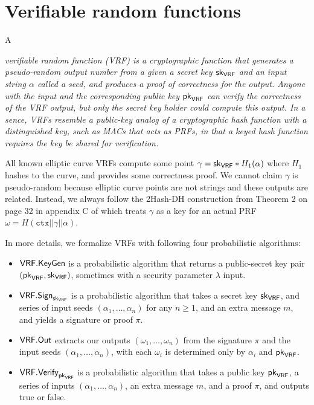 \section{Verifiable random functions}


A {\em verifiable random function (VRF) is a cryptographic function that generates a pseudo-random output number from a given a secret key $\mathsf{sk}_{\mathsf{VRF}}$ and an input string $\alpha$ called a seed, and produces a proof of correctness for the output.  Anyone with the input and the corresponding public key $\mathsf{pk}_{\mathsf{VRF}}$ can verify the correctness of the VRF output, but only the secret key holder could compute this output.  In a sence, VRFs resemble a public-key analog of a cryptographic hash function with a distinguished key, such as MACs that acts as PRFs, in that a keyed hash function requires the key be shared for verification. 

All known elliptic curve VRFs compute some point $\gamma = \mathsf{sk}_{\mathsf{VRF}} * H_1(\alpha)$ where $H_1$ hashes to the curve, and provides some correctness proof.  We cannot claim $\gamma$ is pseudo-random because elliptic curve points are not strings and these outputs are related.  Instead, we always follow the 2Hash-DH construction from Theorem 2 on page 32 in appendix C of \cite{Praos} which treats $\gamma$ as a key for an actual PRF $\omega = H(\mathtt{ctx} || \gamma || \alpha)$.  

In more details, we formalize VRFs with following four probabilistic algorithms: 
\begin{itemize}
\item $\mathsf{VRF}.\mathsf{KeyGen}$ is a probabilistic algorithm that returns a public-secret key pair $(\mathsf{pk}_{\mathsf{VRF}},\mathsf{sk}_{\mathsf{VRF}})$, sometimes with a security parameter $\lambda$ input.
\item $\mathsf{VRF}.\mathsf{Sign}_{\mathsf{sk}_{\mathsf{VRF}}}$ is a probabilistic algorithm that takes a secret key $\mathsf{sk}_{\mathsf{VRF}}$, and series of input seeds $(\alpha_1,\ldots,\alpha_n)$ for any $n\ge1$, and an extra message $m$, and yields a signature or proof $\pi$. 
\item $\mathsf{VRF}.\mathsf{Out}$ extracts our outputs $(\omega_1,\ldots,\omega_n)$ from the signature $\pi$ and the input seeds $(\alpha_1,\ldots,\alpha_n)$, with each $\omega_i$ is determined only by $\alpha_i$ and $\mathsf{pk}_{\mathsf{VRF}}$.
\item $\mathsf{VRF}.\mathsf{Verify}_{\mathsf{pk}_{\mathsf{VRF}}}$ is a probabilistic algorithm that takes a public key $\mathsf{pk}_{\mathsf{VRF}}$, a series of inputs $(\alpha_1,\ldots,\alpha_n)$, an extra message $m$, and a proof $\pi$, and outputs true or false.
\end{itemize}

}
